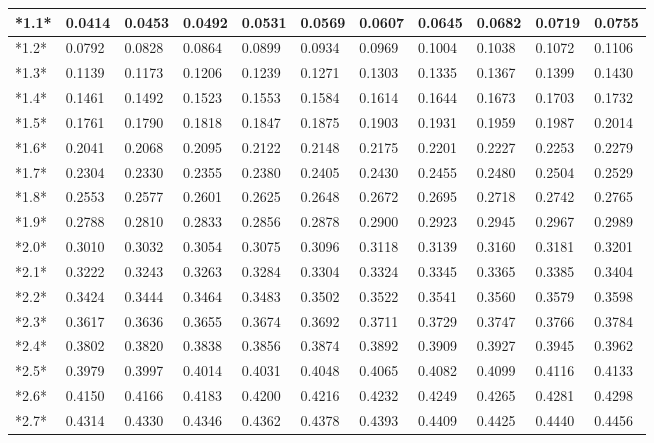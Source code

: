 \documentclass[margin=0.5in]{article}
\begin{document}
\begin{center}
\begin{tabular}{|l|l|l|l|l|l|l|l|l|l|l|}
\hline
*1.1* & 0.0414 & 0.0453 & 0.0492 & 0.0531 & 0.0569 & 0.0607 & 0.0645 & 0.0682 & 0.0719 & 0.0755 \\
\hline
*1.2* & 0.0792 & 0.0828 & 0.0864 & 0.0899 & 0.0934 & 0.0969 & 0.1004 & 0.1038 & 0.1072 & 0.1106 \\
\hline
*1.3* & 0.1139 & 0.1173 & 0.1206 & 0.1239 & 0.1271 & 0.1303 & 0.1335 & 0.1367 & 0.1399 & 0.1430 \\
\hline
*1.4* & 0.1461 & 0.1492 & 0.1523 & 0.1553 & 0.1584 & 0.1614 & 0.1644 & 0.1673 & 0.1703 & 0.1732 \\
\hline
*1.5* & 0.1761 & 0.1790 & 0.1818 & 0.1847 & 0.1875 & 0.1903 & 0.1931 & 0.1959 & 0.1987 & 0.2014 \\
\hline
*1.6* & 0.2041 & 0.2068 & 0.2095 & 0.2122 & 0.2148 & 0.2175 & 0.2201 & 0.2227 & 0.2253 & 0.2279 \\
\hline
*1.7* & 0.2304 & 0.2330 & 0.2355 & 0.2380 & 0.2405 & 0.2430 & 0.2455 & 0.2480 & 0.2504 & 0.2529 \\
\hline
*1.8* & 0.2553 & 0.2577 & 0.2601 & 0.2625 & 0.2648 & 0.2672 & 0.2695 & 0.2718 & 0.2742 & 0.2765 \\
\hline
*1.9* & 0.2788 & 0.2810 & 0.2833 & 0.2856 & 0.2878 & 0.2900 & 0.2923 & 0.2945 & 0.2967 & 0.2989 \\
\hline
*2.0* & 0.3010 & 0.3032 & 0.3054 & 0.3075 & 0.3096 & 0.3118 & 0.3139 & 0.3160 & 0.3181 & 0.3201 \\
\hline
*2.1* & 0.3222 & 0.3243 & 0.3263 & 0.3284 & 0.3304 & 0.3324 & 0.3345 & 0.3365 & 0.3385 & 0.3404 \\
\hline
*2.2* & 0.3424 & 0.3444 & 0.3464 & 0.3483 & 0.3502 & 0.3522 & 0.3541 & 0.3560 & 0.3579 & 0.3598 \\
\hline
*2.3* & 0.3617 & 0.3636 & 0.3655 & 0.3674 & 0.3692 & 0.3711 & 0.3729 & 0.3747 & 0.3766 & 0.3784 \\
\hline
*2.4* & 0.3802 & 0.3820 & 0.3838 & 0.3856 & 0.3874 & 0.3892 & 0.3909 & 0.3927 & 0.3945 & 0.3962 \\
\hline
*2.5* & 0.3979 & 0.3997 & 0.4014 & 0.4031 & 0.4048 & 0.4065 & 0.4082 & 0.4099 & 0.4116 & 0.4133 \\
\hline
*2.6* & 0.4150 & 0.4166 & 0.4183 & 0.4200 & 0.4216 & 0.4232 & 0.4249 & 0.4265 & 0.4281 & 0.4298 \\
\hline
*2.7* & 0.4314 & 0.4330 & 0.4346 & 0.4362 & 0.4378 & 0.4393 & 0.4409 & 0.4425 & 0.4440 & 0.4456 \\

\end{tabular}
\end{center}
\end{document}

